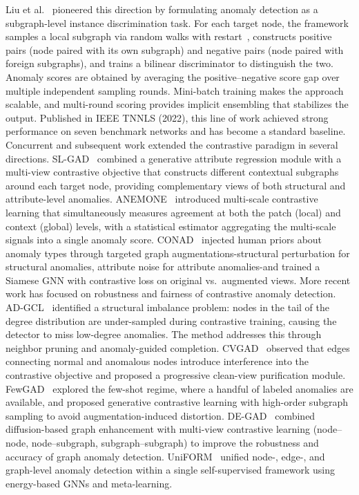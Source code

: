 \documentclass[a4paper]{cas-dc}
\theoremstyle{definition}
\begin{document}
Liu et al.~\cite{liu2022cola} pioneered this direction by formulating anomaly detection as a subgraph-level instance discrimination task.  For each target node, the framework samples a local subgraph via random walks with restart~\cite{tong2006fast,perozzi2014deepwalk}, constructs positive pairs (node paired with its own subgraph) and negative pairs (node paired with foreign subgraphs), and trains a bilinear discriminator to distinguish the two.  Anomaly scores are obtained by averaging the positive--negative score gap over multiple independent sampling rounds.  Mini-batch training makes the approach scalable, and multi-round scoring provides implicit ensembling that stabilizes the output.  Published in IEEE TNNLS (2022), this line of work achieved strong performance on seven benchmark networks and has become a standard baseline.
Concurrent and subsequent work extended the contrastive paradigm in several directions.  {SL-GAD}~\cite{zheng2021slgad} combined a generative attribute regression module with a multi-view contrastive objective that constructs different contextual subgraphs around each target node, providing complementary views of both structural and attribute-level anomalies.  {ANEMONE}~\cite{jin2021anemone} introduced multi-scale contrastive learning that simultaneously measures agreement at both the patch (local) and context (global) levels, with a statistical estimator aggregating the multi-scale signals into a single anomaly score.  {CONAD}~\cite{xu2022conad} injected human priors about anomaly types through targeted graph augmentations-structural perturbation for structural anomalies, attribute noise for attribute anomalies-and trained a Siamese GNN with contrastive loss on original vs.\ augmented views.
More recent work has focused on robustness and fairness of contrastive anomaly detection.  {AD-GCL}~\cite{luo2025adgcl} identified a structural imbalance problem: nodes in the tail of the degree distribution are under-sampled during contrastive training, causing the detector to miss low-degree anomalies.  The method addresses this through neighbor pruning and anomaly-guided completion.  {CVGAD}~\cite{shi2025cvgad} observed that edges connecting normal and anomalous nodes introduce interference into the contrastive objective and proposed a progressive clean-view purification module.  {FewGAD}~\cite{zheng2024fewgad} explored the few-shot regime, where a handful of labeled anomalies are available, and proposed generative contrastive learning with high-order subgraph sampling to avoid augmentation-induced distortion.  {DE-GAD}~\cite{kong2025kbsdegad} combined diffusion-based graph enhancement with multi-view contrastive learning (node--node, node--subgraph, subgraph--subgraph) to improve the robustness and accuracy of graph anomaly detection.  {UniFORM}~\cite{qiao2025uniform} unified node-, edge-, and graph-level anomaly detection within a single self-supervised framework using energy-based GNNs and meta-learning.
\end{document}

